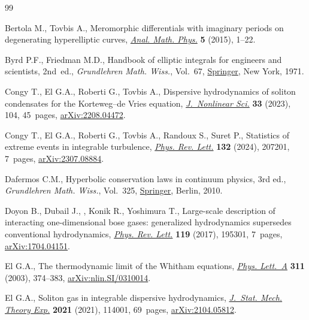 \documentclass[10pt,a4paper]{amsart}
\numberwithin{equation}{section}
\begin{document}
\begin{thebibliography}{99}
\footnotesize\itemsep=0pt

Bertola M., Tovbis A., Meromorphic differentials with imaginary periods on
 degenerating hyperelliptic curves, \href{https://doi.org/10.1007/s13324-014-0088-7}{\textit{Anal. Math. Phys.}} \textbf{5}
 (2015), 1--22.

Byrd P.F., Friedman M.D., Handbook of elliptic integrals for engineers and
 scientists, 2nd~ed., \textit{Grundlehren Math. Wiss.}, Vol.~67, \href{https://doi.org/10.1007/978-3-642-65138-0}{Springer}, New York,
 1971.

Congy T., El G.A., Roberti G., Tovbis A., Dispersive hydrodynamics of soliton
 condensates for the {K}orteweg--de {V}ries equation, \href{https://doi.org/10.1007/s00332-023-09940-y}{\textit{J.~Nonlinear
 Sci.}} \textbf{33} (2023), 104, 45~pages, \href{https://arxiv.org/abs/2208.04472}{arXiv:2208.04472}.

Congy T., El G.A., Roberti G., Tovbis A., Randoux S., Suret P., Statistics of
 extreme events in integrable turbulence, \href{https://doi.org/10.1103/physrevlett.132.207201}{\textit{Phys. Rev. Lett.}}
 \textbf{132} (2024), 207201, 7~pages, \href{https://arxiv.org/abs/2307.08884}{arXiv:2307.08884}.

Dafermos C.M., Hyperbolic conservation laws in continuum physics, 3rd ed.,
 \textit{Grundlehren Math. Wiss.}, Vol.~325, \href{https://doi.org/10.1007/978-3-642-04048-1}{Springer}, Berlin, 2010.

Doyon B., Dubail J., , Konik R., Yoshimura T., Large-scale description of
 interacting one-dimensional bose gases: generalized hydrodynamics supersedes
 conventional hydrodynamics, \href{https://doi.org/10.1103/PhysRevLett.119.195301}{\textit{Phys. Rev. Lett.}} \textbf{119} (2017),
 195301, 7~pages, \href{https://arxiv.org/abs/1704.04151}{arXiv:1704.04151}.

El G.A., The thermodynamic limit of the {W}hitham equations, \href{https://doi.org/10.1016/S0375-9601(03)00515-2}{\textit{Phys.
 Lett.~A}} \textbf{311} (2003), 374--383, \href{https://arxiv.org/abs/nlin.SI/0310014}{arXiv:nlin.SI/0310014}.

El G.A., Soliton gas in integrable dispersive hydrodynamics, \href{https://doi.org/10.1088/1742-5468/ac0f6d}{\textit{J.~Stat.
 Mech. Theory Exp.}} \textbf{2021} (2021), 114001, 69~pages,
 \href{https://arxiv.org/abs/2104.05812}{arXiv:2104.05812}.


\end{thebibliography}
\end{document}
